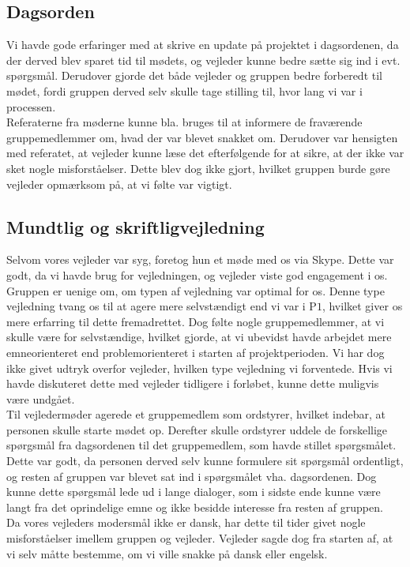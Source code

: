 \subsection{Dagsorden}
Vi havde gode erfaringer med at skrive en update på projektet i dagsordenen, da der derved blev sparet tid til mødets, og vejleder kunne bedre sætte sig ind i evt. spørgsmål. Derudover gjorde det både vejleder og gruppen bedre forberedt til mødet, fordi gruppen derved selv skulle tage stilling til, hvor lang vi var i processen. \\
Referaterne fra møderne kunne bla. bruges til at informere de fraværende gruppemedlemmer om, hvad der var blevet snakket om. Derudover var hensigten med referatet, at vejleder kunne læse det efterfølgende for at sikre, at der ikke var sket nogle misforståelser. Dette blev dog ikke gjort, hvilket gruppen burde gøre vejleder opmærksom på, at vi følte var vigtigt. 
	
\subsection{Mundtlig og skriftligvejledning}
Selvom vores vejleder var syg, foretog hun et møde med os via Skype. Dette var godt, da vi havde brug for vejledningen, og vejleder viste god engagement i os. \\
Gruppen er uenige om, om typen af vejledning var optimal for os. Denne type vejledning tvang os til at agere mere selvstændigt end vi var i P$1$, hvilket giver os mere erfarring til dette fremadrettet. Dog følte nogle gruppemedlemmer, at vi skulle være for selvstændige, hvilket gjorde, at vi ubevidst havde arbejdet mere emneorienteret end problemorienteret i starten af projektperioden. Vi har dog ikke givet udtryk overfor vejleder, hvilken type vejledning vi forventede. Hvis vi havde diskuteret dette med vejleder tidligere i forløbet, kunne dette muligvis være undgået. \\
Til vejledermøder agerede et gruppemedlem som ordstyrer, hvilket indebar, at personen skulle starte mødet op. Derefter skulle ordstyrer uddele de forskellige spørgsmål fra dagsordenen til det gruppemedlem, som havde stillet spørgsmålet. Dette var godt, da personen derved selv kunne formulere sit spørgsmål ordentligt, og resten af gruppen var blevet sat ind i spørgsmålet vha. dagsordenen. Dog kunne dette spørgsmål lede ud i lange dialoger, som i sidste ende kunne være langt fra det oprindelige emne og ikke besidde interesse fra resten af gruppen. \\
Da vores vejleders modersmål ikke er dansk, har dette til tider givet nogle misforståelser imellem gruppen og vejleder. Vejleder sagde dog fra starten af, at vi selv måtte bestemme, om vi ville snakke på dansk eller engelsk.
	
